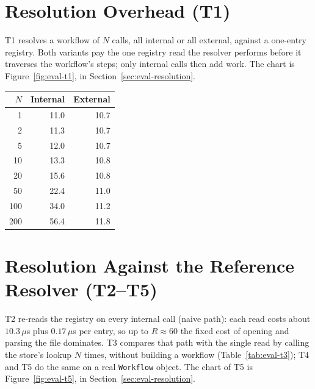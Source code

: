 \FloatBlock
\section{Resolution Overhead (T1)}

T1 resolves a workflow of $N$ calls, all internal or all external, against a one-entry registry.
Both variants pay the one registry read the resolver performs before it traverses the workflow's
steps; only internal calls then add work. The chart is Figure~\ref{fig:eval-t1}, in
Section~\ref{sec:eval-resolution}.

\bigskip
\noindent\begin{minipage}{\textwidth}
  \centering
  {\captionsetup{textfont=sf}
  \label{tab:eval-t1}}
  \small
  \begin{tabular}{|r|r|r|}
    \hline
    \textbf{$N$} & \textbf{Internal} & \textbf{External} \\
    \hline
    1   & 11.0 & 10.7 \\
    \hline
    2   & 11.3 & 10.7 \\
    \hline
    5   & 12.0 & 10.7 \\
    \hline
    10  & 13.3 & 10.8 \\
    \hline
    20  & 15.6 & 10.8 \\
    \hline
    50  & 22.4 & 11.0 \\
    \hline
    100 & 34.0 & 11.2 \\
    \hline
    200 & 56.4 & 11.8 \\
    \hline
  \end{tabular}
  \normalsize
\end{minipage}

\FloatBlock
\section{Resolution Against the Reference Resolver (T2--T5)}

T2 re-reads the registry on every internal call (naive path): each read costs about $10.3\,\mu$s
plus $0.17\,\mu$s per entry, so up to $R \approx 60$ the fixed cost of opening and parsing the file
dominates. T3 compares that path with the single read by calling the store's lookup $N$ times,
without building a workflow (Table~\ref{tab:eval-t3}); T4 and T5 do the same on a real
\texttt{Workflow} object. The chart of T5 is Figure~\ref{fig:eval-t5}, in
Section~\ref{sec:eval-resolution}.

